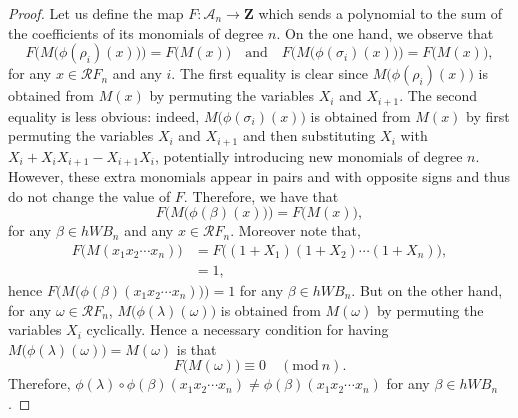 \documentclass[10pt,a4paper]{amsart}
\begin{document}
\begin{proof}
Let us define the map $F:\mathcal{A}_n\to\mathbf{Z}$ which sends a polynomial to the sum of the coefficients of its monomials of degree $n$. On the one hand, we observe that 
\[F\Big(M\big(\phi(\rho_i)(x)\big)\Big)=F\big(M(x)\big) \quad \text{and}\quad F\Big(M\big(\phi(\sigma_i)(x)\big)\Big)=F\big(M(x)\big),\] for any $x\in\mathcal RF_n$ and any $i$. The first equality is clear since $M\big(\phi(\rho_i)(x)\big)$ is obtained from $M(x)$ by permuting the variables $X_i$ and $X_{i+1}$. The second equality is less obvious: indeed, $M\big(\phi(\sigma_i)(x)\big)$ is obtained from $M(x)$ by first permuting the variables $X_i$ and $X_{i+1}$ and then substituting $X_i$ with $X_i + X_iX_{i+1} - X_{i+1}X_i$, potentially introducing new monomials of degree $n$. However, these extra monomials appear in pairs and with opposite signs and thus do not change the value of $F$. Therefore, we have that 
$$F\big(M\big(\phi(\beta)(x)\big)\big)=F\big(M(x)\big),$$
for any $\beta\in hWB_n$ and any $x\in\mathcal RF_n$. Moreover note that,
\begin{align*}
    F\big(M(x_1x_2\cdots x_n)\big)&=F\big((1+X_1)(1+X_2)\cdots(1+X_n)\big),\\
    &=1,
\end{align*}
hence $F\big(M\big(\phi(\beta)(x_1x_2\cdots x_n)\big)\big)=1$ for any $\beta\in hWB_n$.
But on the other hand, for any $\omega\in\mathcal RF_n$, $M\big(\phi(\lambda)(\omega)\big)$ is obtained from $M(\omega)$ by permuting the variables $X_i$ cyclically. Hence a necessary condition for having $M\big(\phi(\lambda)(\omega)\big)=M(\omega)$ is that $$F\big(M(\omega)\big)\equiv0\quad(\mathrm{mod}\ n).$$
Therefore, $\phi(\lambda)\circ\phi(\beta)(x_1x_2\cdots x_n)\neq\phi(\beta)(x_1x_2\cdots x_n)$ for any $\beta\in hWB_n$.
\end{proof}
\end{document}
